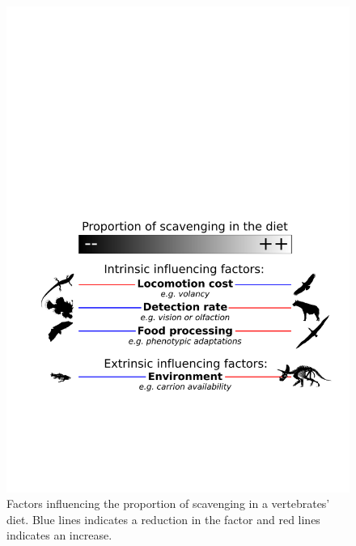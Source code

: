 \documentclass[a4paper,12pt]{article}
\begin{document}
\begin{figure}[!htbp]
\centering
   \includegraphics[width=1\textwidth]{Summary_figure/Summary_figure.pdf}
\caption{Factors influencing the proportion of scavenging in a vertebrates' diet. Blue lines indicates a reduction in the factor and red lines indicates an increase.}
\label{Summary_figure}
\end{figure}


\end{document}
